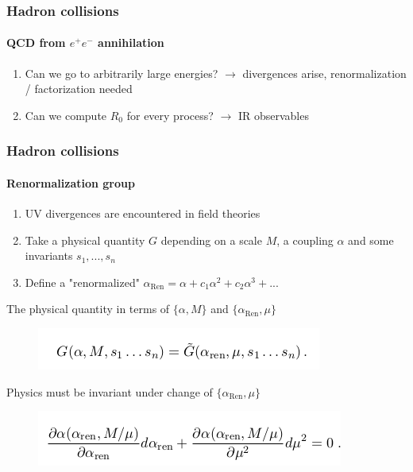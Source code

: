 \documentclass[aspectratio=43]{beamer}
\begin{document}
\begin{frame}
	
	\frametitle{Hadron collisions}
	\framesubtitle{QCD from $e^{+}e^{-}$ annihilation}
	
	\begin{enumerate}
		\item Can we go to arbitrarily large energies? $\rightarrow$ divergences arise, renormalization / factorization needed
		\item Can we compute $R_{0}$ for every process? $\rightarrow$ IR observables
	\end{enumerate}	

\end{frame}

\begin{frame}

	\frametitle{Hadron collisions}
	\framesubtitle{Renormalization group}
	
	\begin{enumerate}
		\item UV divergences are encountered in field theories
		\item Take a physical quantity $G$ depending on a scale $M$, a coupling $\alpha$ and some invariants $s_{1}, ..., s_{n}$	
		\item Define a "renormalized" $\alpha_{\textrm{Ren}} = \alpha + c_{1}\alpha^{2} + c_{2}\alpha^{3} + ...$
	\end{enumerate}
 
	The physical quantity in terms of $\{\alpha, M\}$ and $\{\alpha_{\textrm{Ren}}, \mu\}$ 
	\begin{figure}
		\includegraphics[width = 7 cm]{plots/eq_RGE.png}
	\end{figure}

	Physics must be invariant under change of $\{\alpha_{\textrm{Ren}}, \mu\}$
	\begin{figure}
		\includegraphics[width = 7 cm]{plots/eq_RGE_2.png}
	\end{figure}

\end{frame}
\end{document}
